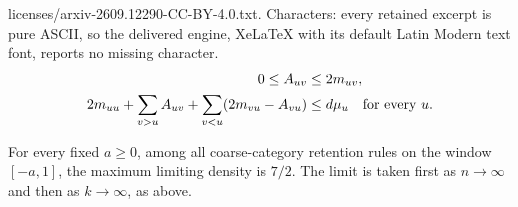 \documentclass[10pt,a4paper]{amsart}
\begin{document}
licenses/arxiv-2609.12290-CC-BY-4.0.txt. Characters: every retained excerpt is pure ASCII, so the delivered engine, XeLaTeX with its default Latin Modern text font, reports no missing character.
\begin{align}\label{eq:allocation}
0\le A_{uv}&\le2m_{uv},\notag\\
2m_{uu}+\sum_{v>u}A_{uv}+\sum_{v<u}(2m_{vu}-A_{vu})&\le d\mu_u
\quad\text{for every }u.
\end{align}

\begin{theorem}\label{thm:one-right}
For every fixed $a\ge0$, among all coarse-category retention rules on the window $[-a,1]$, the maximum limiting density is $7/2$. The limit is taken first as $n\to\infty$ and then as $k\to\infty$, as above.
\end{theorem}
\end{document}
